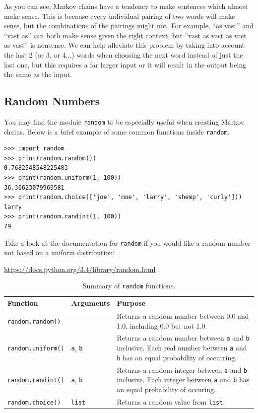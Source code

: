 \documentclass[11pt]{cselabheader}
\begin{document}
As you can see, Markov chains have a tendency to make sentences which almost
make sense. This is because every individual pairing of two words will make
sense, but the combinations of the pairings might not. For example, ``as vast''
and ``vast as'' can both make sense given the right context, but ``vast as vast
as vast as vast'' is nonsense. We can help alleviate this problem by taking into
account the last 2 (or 3, or 4...) words when choosing the next word instead of
just the last one, but this requires a far larger input or it will result in the
output being the same as the input.

\subsection{Random Numbers}
\label{subsec:random}
You may find the module \lstinline{random} to be especially useful when
creating Markov chains. Below is a brief example of some common functions
inside \lstinline{random}.

\begin{lstlisting}[style=ipython]
>>> import random
>>> print(random.random())
0.7682548548225483
>>> print(random.uniform(1, 100))
36.30623079969581
>>> print(random.choice(['joe', 'moe', 'larry', 'shemp', 'curly']))
larry
>>> print(random.randint(1, 100))
79
\end{lstlisting}

Take a look at the documentation for \lstinline!random! if you would like a
random number not based on a uniform distribution:
\begin{center}
  \url{https://docs.python.org/3.4/library/random.html}
\end{center}

\begin{table}[!ht]
  \centering
  \begin{tabular}{p{3.0cm} p{2cm} p{10cm}}
    \toprule
    \bfseries Function & \bfseries Arguments & \bfseries Purpose \\
    \midrule
    \lstinline{random.random()} & & Returns a random number between 0.0 and 1.0,
    including 0.0 but not 1.0.\\
    \lstinline{random.uniform()} & \lstinline{a}, \lstinline{b} & Returns a
    random number between \lstinline{a} and \lstinline{b} inclusive. Each real number between
    \lstinline!a! and \lstinline!b! has an equal probability of occurring.\\
    \lstinline{random.randint()} & \lstinline{a}, \lstinline{b} & Returns a
    random integer between \lstinline{a} and \lstinline{b} inclusive. Each integer between
    \lstinline!a! and \lstinline!b! has an equal probability of occuring.\\
    \lstinline{random.choice()} & \lstinline{list} & Returns a random value from \lstinline{list}.\\
    \bottomrule
  \end{tabular}
  \caption{Summary of \lstinline{random} functions.}
  \label{tab:rand}
\end{table}
\end{document}
